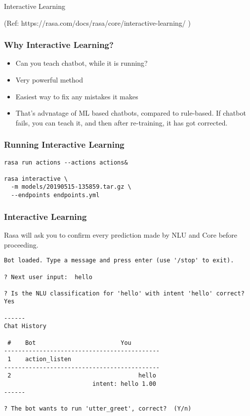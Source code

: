 \begin{frame}[fragile]\frametitle{}
\begin{center}
{\Large Interactive Learning}

{\tiny (Ref: https://rasa.com/docs/rasa/core/interactive-learning/ )}
\end{center}
\end{frame}

 \begin{frame}[fragile]\frametitle{Why Interactive Learning?}
\begin{itemize}
\item Can you teach chatbot, while it is running?
\item Very powerful method
\item Easiest way to fix any mistakes it makes
\item That's advnatage of ML based chatbots, compared to rule-based. If chatbot fails, you can teach it, and then after re-training, it has got corrected.
\end{itemize}
\end{frame}

 \begin{frame}[fragile]\frametitle{Running Interactive Learning}
\begin{lstlisting}
rasa run actions --actions actions&

rasa interactive \
  -m models/20190515-135859.tar.gz \
  --endpoints endpoints.yml
\end{lstlisting}
\end{frame}

 \begin{frame}[fragile]\frametitle{Interactive Learning}
 Rasa will ask you to confirm every prediction made by NLU and Core before proceeding. 
\begin{lstlisting}
Bot loaded. Type a message and press enter (use '/stop' to exit).

? Next user input:  hello

? Is the NLU classification for 'hello' with intent 'hello' correct?  Yes

------
Chat History

 #    Bot                        You
--------------------------------------------
 1    action_listen
--------------------------------------------
 2                                    hello
                         intent: hello 1.00
------

? The bot wants to run 'utter_greet', correct?  (Y/n)
\end{lstlisting}
\end{frame}

